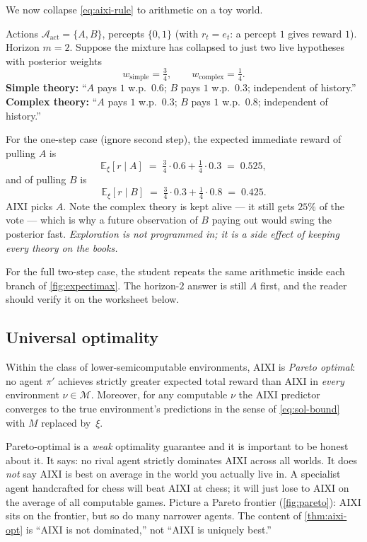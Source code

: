 We now collapse \eqref{eq:aixi-rule} to arithmetic on a toy world.

\begin{example}
\label{ex:aixi-hand}
Actions $\mathcal{A}_{\mathrm{act}}=\{A,B\}$, percepts $\{0,1\}$ (with
$r_t = e_t$: a percept $1$ gives reward $1$).  Horizon $m=2$.  Suppose
the mixture has collapsed to just two live hypotheses with posterior
weights
\[
  w_{\mathrm{simple}}=\tfrac{3}{4},\qquad w_{\mathrm{complex}}=\tfrac{1}{4}.
\]
\textbf{Simple theory:} ``$A$ pays $1$ w.p.\ $0.6$; $B$ pays $1$ w.p.\
$0.3$; independent of history.''
\textbf{Complex theory:} ``$A$ pays $1$ w.p.\ $0.3$; $B$ pays $1$ w.p.\
$0.8$; independent of history.''

For the one-step case (ignore second step), the expected immediate
reward of pulling $A$ is
\[
  \mathbb{E}_\xi[r \mid A]
  \;=\; \tfrac{3}{4}\cdot 0.6 + \tfrac{1}{4}\cdot 0.3
  \;=\; 0.525,
\]
and of pulling $B$ is
\[
  \mathbb{E}_\xi[r \mid B]
  \;=\; \tfrac{3}{4}\cdot 0.3 + \tfrac{1}{4}\cdot 0.8
  \;=\; 0.425.
\]
AIXI picks $A$.  Note the complex theory is kept alive --- it still
gets $25\%$ of the vote --- which is why a future observation of $B$
paying out would swing the posterior fast.  \emph{Exploration is not
programmed in; it is a side effect of keeping every theory on the
books.}

For the full two-step case, the student repeats the same arithmetic
inside each branch of \cref{fig:expectimax}.  The horizon-$2$ answer
is still $A$ first, and the reader should verify it on the worksheet
below.
\end{example}

\subsection*{Universal optimality}

\begin{theorem}
\label{thm:aixi-opt}
Within the class of lower-semicomputable environments, AIXI is
\emph{Pareto optimal}: no agent $\pi'$ achieves strictly greater
expected total reward than AIXI in \emph{every} environment $\nu \in
\mathcal{M}$.  Moreover, for any computable $\nu$ the AIXI predictor
converges to the true environment's predictions in the sense of
\eqref{eq:sol-bound} with $M$ replaced by~$\xi$.
\end{theorem}

\begin{intuition}
Pareto-optimal is a \emph{weak} optimality guarantee and it is
important to be honest about it.  It says: no rival agent strictly
dominates AIXI across all worlds.  It does \emph{not} say AIXI is best
on average in the world you actually live in.  A specialist agent
handcrafted for chess will beat AIXI at chess; it will just lose to
AIXI on the average of all computable games.  Picture a
Pareto frontier (\cref{fig:pareto}): AIXI sits on the frontier, but so
do many narrower agents.  The content of \cref{thm:aixi-opt} is
``AIXI is not dominated,'' not ``AIXI is uniquely best.''
\end{intuition}


